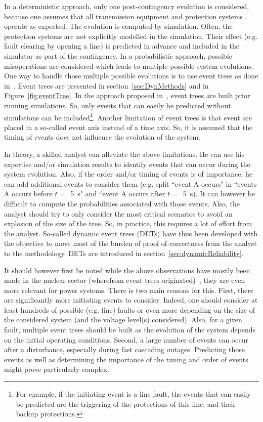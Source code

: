 In a deterministic approach, only one post-contingency evolution is considered, because one assumes that all transmission equipment and protection systems operate as expected. The evolution is computed by simulation. Often, the protection systems are not explicitly modelled in the simulation. Their effect (e.g. fault clearing by opening a line) is predicted in advance and included in the simulator as part of the contingency. In a probabilistic approach, possible misoperations are considered which leads to multiple possible system evolutions. One way to handle those multiple possible evolutions is to use event trees as done in~\cite{Haarla, GridPSA}. Event trees are presented in section~\ref{sec:DynMethods} and in Figure~\ref{fig:eventTree}. In the approach proposed in~\cite{Haarla, GridPSA}, event trees are built prior running simulations. So, only events that can easily be predicted without simulations can be included\footnote{For example, if the initiating event is a line fault, the events that can easily be predicted are the triggering of the protections of this line, and their backup protections.}. Another limitation of event trees is that event are placed in a so-called event axis instead of a time axis. So, it is assumed that the timing of events does not influence the evolution of the system.

In theory, a skilled analyst can alleviate the above limitations. He can use his expertise and/or simulation results to identify events that can occur during the system evolution. Also, if the order and/or timing of events is of importance, he can add additional events to consider them (e.g. split ``event A occurs" in ``events A occurs before \(t=\)~5~s" and ``event A occurs after \(t=\)~5~s). It can however be difficult to compute the probabilities associated with those events. Also, the analyst should try to only consider the most critical scenarios to avoid an explosion of the size of the tree. So, in practice, this requires a lot of effort from the analyst. So-called dynamic event trees (DETs) have thus been developed with the objective to move most of the burden of proof of correctness from the analyst to the methodology. DETs are introduced in section~\ref{sec:dynamicReliability}.

It should however first be noted while the above observations have mostly been made in the nuclear sector (wherefrom event trees originated)~\cite{LabeauTowards}, they are even more relevant for power systems. There is two main reasons for this. First, there are significantly more initiating events to consider. Indeed, one should consider at least hundreds of possible (e.g. line) faults or even more depending on the size of the considered system (and the voltage level(s) considered). Also, for a given fault, multiple event trees should be built as the evolution of the system depends on the initial operating conditions. Second, a large number of events can occur after a disturbance, especially during fast cascading outages. Predicting those events as well as determining the importance of the timing and order of events might prove particularly complex.

